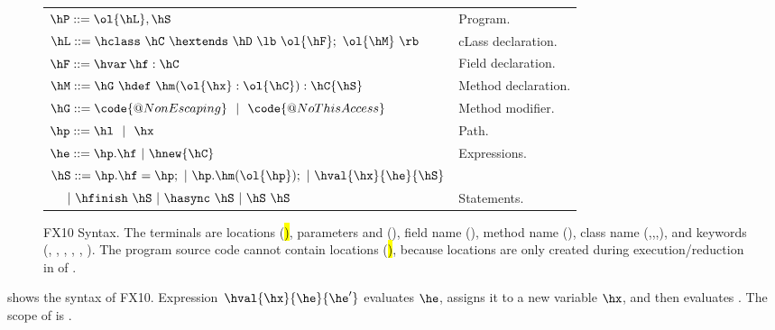 \begin{figure}[htpb!]
\begin{center}
\begin{tabular}{|l|l|}
\hline

$\hP ::= \ol{\hL},\hS$ & Program. \\

$\hL ::= \hclass ~ \hC~\hextends~\hD~\lb~\ol{\hF};~\ol{\hM}~\rb$
& cLass declaration. \\

$\hF ::= \hvar\,\hf:\hC$
& Field declaration. \\

$\hM ::= \hG\ \hdef\ \hm(\ol{\hx}:\ol{\hC}):\hC\{\hS\}$
& Method declaration. \\

$\hG ::= \code{@NonEscaping} ~~|~~ \code{@NoThisAccess}$
& Method modifier. \\

$\hp ::= \hl ~~|~~ \hx$
& Path. \\ %

$\he ::=  \hp.\hf  ~|~ \hnew{\hC}$ 
& Expressions. \\ %

$\hS ::=  \hp.\hf = \hp; ~|~ \hp.\hm(\ol{\hp});  ~|~ \hval{\hx}{\he}{\hS}$ &\\
$~~~~|~ \hfinish~\hS~|~ \hasync~\hS ~|~ \hS\ \hS$
& Statements. \\ %

\hline
\end{tabular}
\end{center}
\caption{FX10 Syntax.
    The terminals are locations (\hl), parameters and \hthis (\hx), field name (\hf), method name (\hm), class name (\hB,\hC,\hD,\hObject),
        and keywords (\hescaping, \nonescaping, \hhnew, \finish, \async, ).
    The program source code cannot contain locations (\hl), because locations are only created during execution/reduction in  of .
    }
\label{Figure:syntax}
\end{figure}

 shows the syntax of FX10.
Expression~$\hval{\hx}{\he}{\he'}$ evaluates $\he$, assigns it to a
new variable $\hx$, and then evaluates \hS. The scope of \he{} is \hS.

